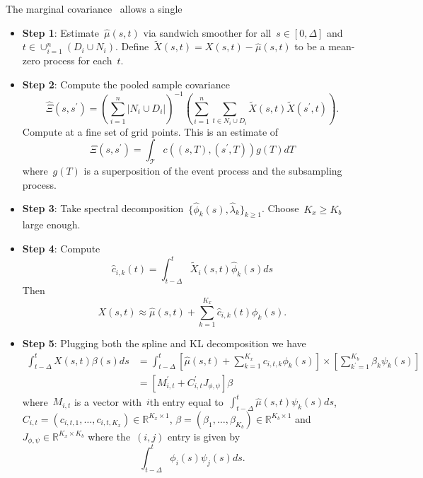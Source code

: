 \documentclass[11pt]{amsart}
\begin{document}
The marginal covariance~\cite{Park2018} allows a single 
\begin{itemize}
\item {\bf Step 1}: Estimate~$\hat \mu(s,t)$ via sandwich smoother for
  all~$s \in [0,\Delta]$ and~$t \in \cup_{i=1}^n \left( D_i \cup N_i
  \right)$. Define~$\tilde X (s,t) = X(s,t) - \hat \mu(s,t)$ to be a
  mean-zero process for each~$t$.
\item {\bf Step 2}: Compute the pooled sample covariance
\[
\hat \Xi (s , s^\prime) = 
\left( \sum_{i=1}^n \left | N_i \cup D_i \right |\right)^{-1}
\left( \sum_{i=1}^n \sum_{t \in N_i \cup D_i} \tilde X (s,t) \tilde X
  (s^\prime, t) \right).
\]
Compute at a fine set of grid points. This is an estimate of 
\[
\Xi (s, s^\prime) = \int_{\mathcal{T}} c( (s,T), (s^\prime, T) ) g(T) dT
\]
where~$g(T)$ is a superposition of the event process and the
subsampling process.
\item {\bf Step 3}: Take spectral decomposition~$\{ \hat \phi_k (s),
  \hat \lambda_k \}_{k \geq 1}$. Choose~$K_x \geq K_b$ large enough.
\item {\bf Step 4}: Compute
\[
\hat c_{i,k} (t) = \int_{t-\Delta}^t \tilde X_i (s,t) \hat \phi_k (s) ds
\]
Then
\[
X(s,t) \approx \hat \mu(s,t) + \sum_{k=1}^{K_x} \hat c_{i,k} (t)
\phi_k (s).
\]
\item {\bf Step 5}: Plugging both the spline and KL decomposition we
  have
\begin{align*}
\int_{t-\Delta}^t X(s,t) \beta(s) ds 
  &= \int_{t-\Delta}^t \left[ \hat \mu(s,t) + \sum_{k=1}^{K_x}
    c_{i,t,k} \phi_k (s) \right] \times \left[ \sum_{k^\prime=1}^{K_b}
    \beta_k \psi_k (s) \right] \\
  &= [ M_{i,t}^\prime + C_{i,t}^\prime J_{\phi, \psi} ] \beta
\end{align*}
where~$M_{i,t}$ is a vector with~$i$th entry equal
to~$\int_{t-\Delta}^t \hat \mu(s,t) \psi_k (s) ds$, $C_{i,t} =
(c_{i,t,1}, \ldots, c_{i,t,K_x}) \in \mathbb{R}^{K_x \times 1}$,
$\beta = (\beta_1, \ldots, \beta_{K_b}) \in \mathbb{R}^{K_b \times 1}$
and~$J_{\phi, \psi} \in \mathbb{R}^{K_x \times K_b}$ where the~$(i,j)$
entry is given by
\[
\int_{t-\Delta}^t \phi_{i} (s) \psi_{j} (s) ds.
\]
\end{itemize}
\end{document}

